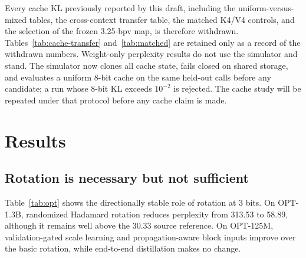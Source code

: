 \documentclass[10pt,twocolumn]{article}
\begin{document}
Every cache KL previously reported by this draft, including the
uniform-versus-mixed tables, the cross-context transfer table, the matched
K4/V4 controls, and the selection of the frozen 3.25-bpv map, is therefore
withdrawn. Tables~\ref{tab:cache-transfer} and~\ref{tab:matched} are retained
only as a record of the withdrawn numbers. Weight-only perplexity results do
not use the simulator and stand. The simulator now clones all cache state,
fails closed on shared storage, and evaluates a uniform 8-bit cache on the same
held-out calls before any candidate; a run whose 8-bit KL exceeds $10^{-2}$ is
rejected. The cache study will be repeated under that protocol before any
cache claim is made.

\section{Results}

\subsection{Rotation is necessary but not sufficient}

Table~\ref{tab:opt} shows the directionally stable role of rotation at 3 bits.
On OPT-1.3B, randomized Hadamard rotation reduces perplexity from 313.53 to
58.89, although it remains well above the 30.33 source reference. On OPT-125M,
validation-gated scale learning and propagation-aware block inputs improve over
the basic rotation, while end-to-end distillation makes no change.

\begin{table}[t]
\centering
\small
\caption{Development perplexity on WikiText-2. Values after the first two
OPT-125M rows are single-seed ablations. The learned stages are cumulative.}
\label{tab:opt}
\end{table}
\end{document}
